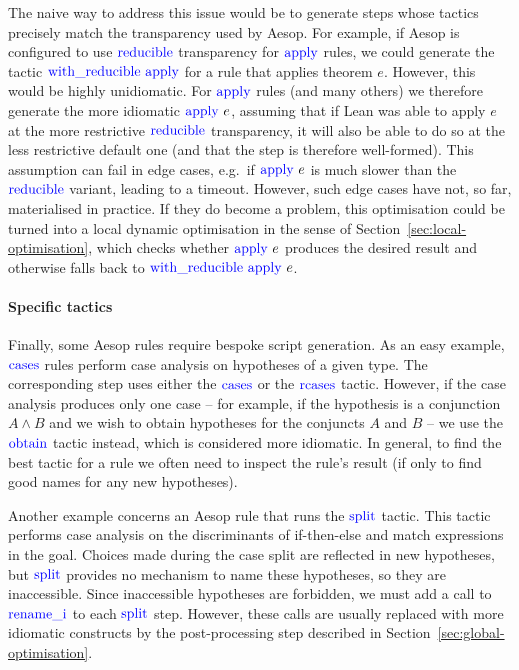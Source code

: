 \documentclass[sigplan,10pt,anonymous,review]{acmart}
\newcommand{\tac}[1]{\ensuremath{\mathrm{\mathcolor{blue}{#1}}}}
\begin{document}
The naive way to address this issue would be to generate steps whose tactics precisely match the transparency used by Aesop.
For example, if Aesop is configured to use \tac{reducible} transparency for \tac{apply} rules, we could generate the tactic $\tac{with\_reducible}~\tac{apply}$ for a rule that applies theorem $e$.
However, this would be highly unidiomatic.
For \tac{apply} rules (and many others) we therefore generate the more idiomatic $\tac{apply}~e$, assuming that if Lean was able to apply $e$ at the more restrictive \tac{reducible} transparency, it will also be able to do so at the less restrictive default one (and that the step is therefore well-formed).
This assumption can fail in edge cases, e.g.\ if $\tac{apply}~e$ is much slower than the \tac{reducible} variant, leading to a timeout.
However, such edge cases have not, so far, materialised in practice.
If they do become a problem, this optimisation could be turned into a local dynamic optimisation in the sense of Section~\ref{sec:local-optimisation}, which checks whether $\tac{apply}~e$ produces the desired result and otherwise falls back to $\tac{with\_reducible}~\tac{apply}~e$.

\paragraph{Specific tactics}
Finally, some Aesop rules require bespoke script generation.
As an easy example, \tac{cases} rules perform case analysis on hypotheses of a given type.
The corresponding step uses either the $\tac{cases}$ or the $\tac{rcases}$ tactic.
However, if the case analysis produces only one case -- for example, if the hypothesis is a conjunction $A ∧ B$ and we wish to obtain hypotheses for the conjuncts $A$ and $B$ -- we use the \tac{obtain} tactic instead, which is considered more idiomatic.
In general, to find the best tactic for a rule we often need to inspect the rule's result (if only to find good names for any new hypotheses).

Another example concerns an Aesop rule that runs the \tac{split} tactic.
This tactic performs case analysis on the discriminants of if-then-else and match expressions in the goal.
Choices made during the case split are reflected in new hypotheses, but \tac{split} provides no mechanism to name these hypotheses, so they are inaccessible.
Since inaccessible hypotheses are forbidden, we must add a call to \tac{rename\_i} to each \tac{split} step.
However, these calls are usually replaced with more idiomatic constructs by the post-processing step described in Section~\ref{sec:global-optimisation}.
\end{document}
